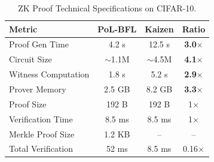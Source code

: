 
\begin{table}[t]
\centering
\caption{ZK Proof Technical Specifications on CIFAR-10.}
\label{tab:zk_details}
\small
\begin{tabular}{l|cc|c}
\toprule
\textbf{Metric} & \textbf{PoL-BFL} & \textbf{Kaizen} & \textbf{Ratio} \\
\midrule
Proof Gen Time & 4.2 s & 12.5 s & \textbf{3.0$\times$} \\
Circuit Size & $\sim$1.1M & $\sim$4.5M & \textbf{4.1$\times$} \\
Witness Computation & 1.8 s & 5.2 s & \textbf{2.9$\times$} \\
Prover Memory & 2.5 GB & 8.2 GB & \textbf{3.3$\times$} \\
Proof Size & 192 B & 192 B & 1$\times$ \\
Verification Time & 8.5 ms & 8.5 ms & 1$\times$ \\
Merkle Proof Size & 1.2 KB & -- & -- \\
Total Verification & 52 ms & 8.5 ms & 0.16$\times$ \\
\bottomrule
\end{tabular}
\end{table}
